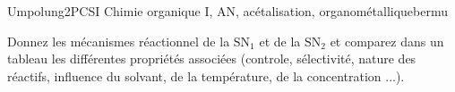 
\begin{exercise}{Umpolung}{2}{PCSI}
{Chimie organique I, AN, acétalisation, organométallique}{bermu}


\begin{questions}
\questioncours Donnez les mécanismes réactionnel de la $\mathrm{SN_1}$ et de la $\mathrm{SN_2}$ et comparez dans un tableau les différentes propriétés associées (controle, sélectivité, nature des réactifs, influence du solvant, de la température, de la concentration ...).


\end{questions}
\end{exercise}